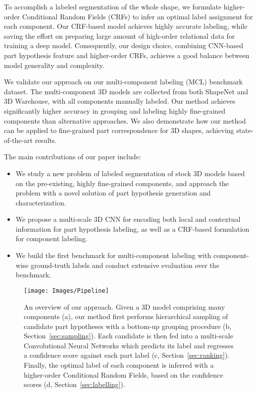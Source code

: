 \documentclass[acmtog]{acmart}
\begin{document}
{To accomplish a labeled segmentation of the whole shape,
we formulate higher-order Conditional Random Fields (CRFs) to
infer an optimal label assignment for each component.
Our CRF-based model achieves highly accurate labeling, while saving the effort on preparing large amount of high-order relational data for training a deep model.
Consequently, our design choice, combining CNN-based part hypothesis feature and higher-order CRFs, achieves a good balance between model generality and complexity.

We validate our approach on our multi-component labeling (MCL) benchmark dataset.
The multi-component 3D models are collected from both ShapeNet and 3D Warehouse, with all
components manually labeled.
Our method achieves significantly higher accuracy in grouping and labeling
highly fine-grained components than alternative approaches. We also demonstrate how our method can be applied
to fine-grained part correspondence for 3D shapes, achieving state-of-the-art results.



The main contributions of our paper include:
\begin{itemize}
  \item We study a new problem of labeled segmentation of stock 3D models based on the pre-existing, highly fine-grained components, and
  approach the problem with a novel solution of part hypothesis generation and characterization.
  \item We propose a multi-scale 3D CNN for encoding both local and contextual information for part hypothesis labeling, as well as a CRF-based formulation for component labeling.
  \item We build the first benchmark for multi-component labeling with component-wise ground-truth labels and conduct extensive evaluation over the benchmark.
\end{itemize}



\begin{figure*}[t]
  \centering
  \texttt{[image: Images/Pipeline]}
  \caption{An overview of our approach.
Given a 3D model comprising many components (a),
our method first performs hierarchical sampling of candidate part hypotheses
with a bottom-up grouping procedure (b, Section~\ref{sec:sampling}).
Each candidate is then fed into a multi-scale Convolutional Neural Networks which predicts its label
and regresses a confidence score against each part label (c, Section~\ref{sec:ranking}).
Finally, the optimal label of each component is inferred with
a higher-order Conditional Random Fields, based on the confidence scores (d, Section~\ref{sec:labelling}).}
  \label{fig:pipeline}
\end{figure*}
}
\end{document}
